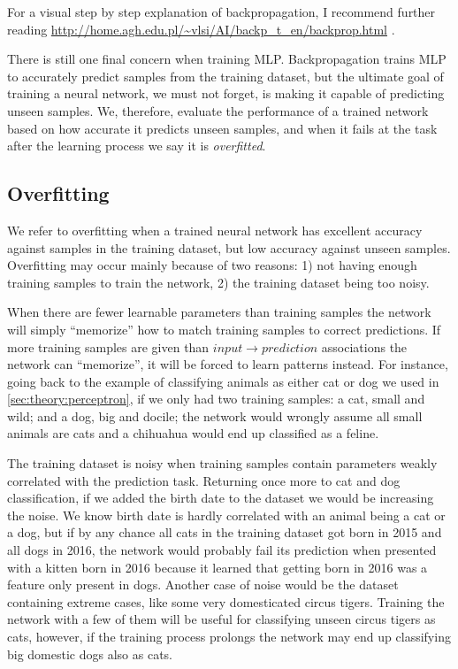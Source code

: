 For a visual step by step explanation of backpropagation, I recommend further reading \url{http://home.agh.edu.pl/~vlsi/AI/backp_t_en/backprop.html} \cite{Bernacki2005}.

There is still one final concern when training MLP.
Backpropagation trains MLP to accurately predict samples from the training dataset, but the ultimate goal of training a neural network, we must not forget, is making it capable of predicting unseen samples.
We, therefore, evaluate the performance of a trained network based on how accurate it predicts unseen samples, and when it fails at the task after the learning process we say it is \emph{overfitted}.


\subsection{Overfitting}
\label{sec:theory:mlp:overfitting}

We refer to overfitting when a trained neural network has excellent accuracy against samples in the training dataset, but low accuracy against unseen samples.
Overfitting may occur mainly because of two reasons: 1) not having enough training samples to train the network, 2) the training dataset being too noisy.

When there are fewer learnable parameters than training samples the network will simply ``memorize'' how to match training samples to correct predictions.
If more training samples are given than $input \rightarrow prediction$ associations the network can ``memorize'', it will be forced to learn patterns instead.
For instance, going back to the example of classifying animals as either cat or dog we used in \autoref{sec:theory:perceptron}, if we only had two training samples: a cat, small and wild; and a dog, big and docile; the network would wrongly assume all small animals are cats and a chihuahua would end up classified as a feline.

The training dataset is noisy when training samples contain parameters weakly correlated with the prediction task.
Returning once more to cat and dog classification, if we added the birth date to the dataset we would be increasing the noise.
We know birth date is hardly correlated with an animal being a cat or a dog, but if by any chance all cats in the training dataset got born in 2015 and all dogs in 2016, the network would probably fail its prediction when presented with a kitten born in 2016 because it learned that getting born in 2016 was a feature only present in dogs.
Another case of noise would be the dataset containing extreme cases, like some very domesticated circus tigers.
Training the network with a few of them will be useful for classifying unseen circus tigers as cats, however, if the training process prolongs the network may end up classifying big domestic dogs also as cats.

